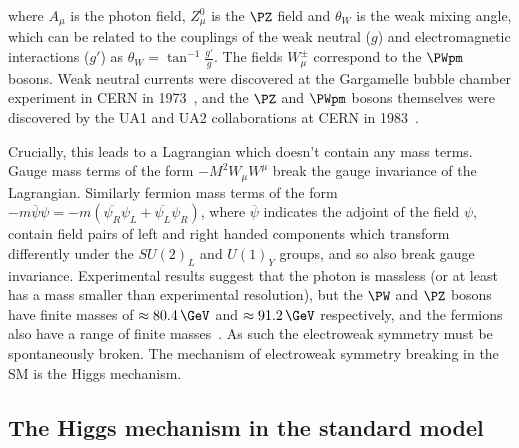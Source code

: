 where $A_{\mu}$ is the photon field, $Z_{\mu}^{0}$ is the $\PZ$ field
and $\theta_{W}$ is the weak mixing angle,
which can be related to the couplings of the weak neutral ($g$) and electromagnetic
interactions ($g'$) as $\theta_{W}=\tan^{-1}{\frac{g'}{g}}$. The fields
$W_{\mu}^{\pm}$ correspond to the $\PWpm$ bosons. Weak neutral
currents were discovered at the Gargamelle bubble chamber experiment in CERN in
1973~\cite{Hasert:1973ff}, and the $\PZ$ and $\PWpm$ bosons themselves were
discovered by the UA1 and UA2 collaborations at CERN in
1983~\cite{Arnison:1983rp,Banner:1983jy,Arnison:1983mk,Bagnaia:1983zx}.

Crucially, this leads to a Lagrangian which doesn't contain any mass terms.
Gauge mass terms of the form $-M^{2}W_{\mu}W^{\mu}$ break the gauge invariance
of the Lagrangian. Similarly fermion mass terms of the form
$-m\overline{\psi}\psi = -m(\overline{\psi_{R}}\psi_{L} +
\overline{\psi_{L}}\psi_{R})$, where $\overline\psi$ indicates the adjoint of
the field $\psi$, contain field pairs of left and right handed components which transform differently
under the $SU(2)_{L}$ and $U(1)_{Y}$ groups, and so also break gauge invariance.
Experimental results suggest that the photon is massless (or at least has a mass
smaller than experimental resolution), but the $\PW$ and $\PZ$
bosons have finite masses of $\approx80.4\,\GeV$ and $\approx91.2\,\GeV$
respectively, and the fermions also have a range of finite masses~\cite{PDG}. As
such the electroweak symmetry must be spontaneously broken. The mechanism of
electroweak symmetry breaking in the \ac{SM} is the Higgs mechanism.

\subsection{The Higgs mechanism in the standard model}
\label{sec:SMHiggs}

